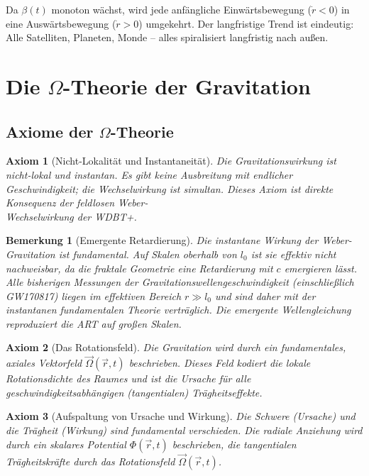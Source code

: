 \documentclass[12pt,a4paper]{article}
\newtheorem{axiom}{Axiom}[section]
\newtheorem{remark}{Bemerkung}[section]
\begin{document}
Da $\beta(t)$ monoton wächst, wird jede anfängliche Einwärtsbewegung ($\dot{r} < 0$) in eine Auswärtsbewegung ($\dot{r} > 0$) umgekehrt. Der langfristige Trend ist eindeutig: Alle Satelliten, Planeten, Monde -- alles spiralisiert langfristig nach außen.

\section{Die $\Omega$-Theorie der Gravitation}

\subsection{Axiome der $\Omega$-Theorie}

\begin{axiom}[Nicht-Lokalität und Instantaneität]
Die Gravitationswirkung ist nicht-lokal und instantan. Es gibt keine Ausbreitung mit endlicher Geschwindigkeit; die Wechselwirkung ist simultan. Dieses Axiom ist direkte Konsequenz
der feldlosen Weber-\\Wechselwirkung der WDBT+.
\end{axiom}

\begin{remark}[Emergente Retardierung]
Die instantane Wirkung der Weber-\\Gravitation ist fundamental. Auf Skalen oberhalb von $l_0$ ist sie effektiv nicht nachweisbar, da die fraktale Geometrie eine Retardierung mit $c$
emergieren lässt. Alle bisherigen Messungen der Gravitationswellengeschwindigkeit (einschließlich GW170817) liegen im effektiven Bereich $r \gg l_0$ und sind daher mit der
instantanen fundamentalen Theorie verträglich. Die emergente Wellengleichung reproduziert die ART auf großen Skalen.
\end{remark}

\begin{axiom}[Das Rotationsfeld]
Die Gravitation wird durch ein fundamentales, axiales Vektorfeld $\vec{\Omega}(\vec{r}, t)$ beschrieben. Dieses Feld kodiert die lokale Rotationsdichte des Raumes und ist die Ursache für alle geschwindigkeitsabhängigen (tangentialen) Trägheitseffekte.
\end{axiom}

\begin{axiom}[Aufspaltung von Ursache und Wirkung]
Die Schwere (Ursache) und die Trägheit (Wirkung) sind fundamental verschieden. Die radiale Anziehung wird durch ein skalares Potential $\Phi(\vec{r}, t)$ beschrieben, die tangentialen Trägheitskräfte durch das Rotationsfeld $\vec{\Omega}(\vec{r}, t)$.
\end{axiom}
\end{document}
